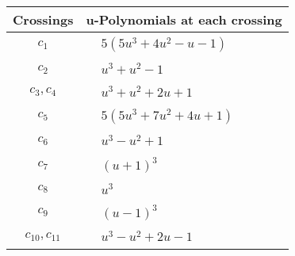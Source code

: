 \documentclass[1p]{elsarticle_modified}
\theoremstyle{definition}
\begin{document}
\begin{tabular}{m{50pt}|m{274pt}}
Crossings & \hspace{64pt}u-Polynomials at each crossing \\
\hline $$\begin{aligned}c_{1}\end{aligned}$$&$\begin{aligned}
&5(5 u^3+4 u^2- u-1)
\end{aligned}$\\
\hline $$\begin{aligned}c_{2}\end{aligned}$$&$\begin{aligned}
&u^3+u^2-1
\end{aligned}$\\
\hline $$\begin{aligned}c_{3},c_{4}\end{aligned}$$&$\begin{aligned}
&u^3+u^2+2 u+1
\end{aligned}$\\
\hline $$\begin{aligned}c_{5}\end{aligned}$$&$\begin{aligned}
&5(5 u^3+7 u^2+4 u+1)
\end{aligned}$\\
\hline $$\begin{aligned}c_{6}\end{aligned}$$&$\begin{aligned}
&u^3- u^2+1
\end{aligned}$\\
\hline $$\begin{aligned}c_{7}\end{aligned}$$&$\begin{aligned}
&(u+1)^3
\end{aligned}$\\
\hline $$\begin{aligned}c_{8}\end{aligned}$$&$\begin{aligned}
&u^3
\end{aligned}$\\
\hline $$\begin{aligned}c_{9}\end{aligned}$$&$\begin{aligned}
&(u-1)^3
\end{aligned}$\\
\hline $$\begin{aligned}c_{10},c_{11}\end{aligned}$$&$\begin{aligned}
&u^3- u^2+2 u-1
\end{aligned}$\\
\hline
\end{tabular}\\~\\
\end{document}
